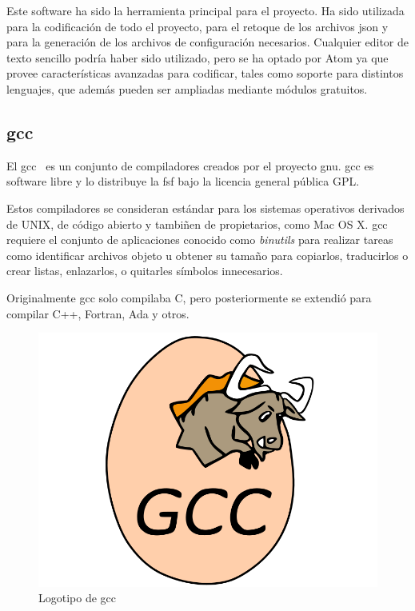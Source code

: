 		\FloatBarrier

		Este software ha sido la herramienta principal para el proyecto. Ha sido utilizada para la codificación de todo el proyecto, para el retoque de los archivos \acrshort{json} y para la generación de los archivos de configuración necesarios. Cualquier editor de texto sencillo podría haber sido utilizado, pero se ha optado por Atom ya que provee características avanzadas para codificar, tales como soporte para distintos lenguajes, que además pueden ser ampliadas mediante módulos gratuitos.

	\subsection{\acrlong{gcc}}

		El \acrfull{gcc}~\cite{gcc} es un conjunto de compiladores creados por el proyecto \acrshort{gnu}. \acrshort{gcc} es software libre y lo distribuye la \acrshort{fsf} bajo la licencia general pública GPL.

		Estos compiladores se consideran estándar para los sistemas operativos derivados de UNIX, de código abierto y tambiñen de propietarios, como Mac OS X. \acrshort{gcc} requiere el conjunto de aplicaciones conocido como \textit{binutils} para realizar tareas como identificar archivos objeto u obtener su tamaño para copiarlos, traducirlos o crear listas, enlazarlos, o quitarles símbolos innecesarios.

		Originalmente \acrshort{gcc} solo compilaba C, pero posteriormente se extendió para compilar C++, Fortran, Ada y otros.

		\begin{figure}[!htp]
			 \centering
			 \includegraphics[scale=.25]{fig/gcc}
			 \caption{Logotipo de \acrshort{gcc}}
			 \label{fig:gcc}
		\end{figure}


